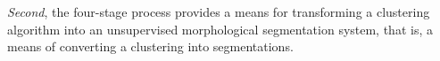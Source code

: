 \textit{Second}, the four-stage process provides a means for 
transforming a clustering algorithm into an unsupervised morphological 
segmentation system, that is, a means of converting a clustering into segmentations. %

